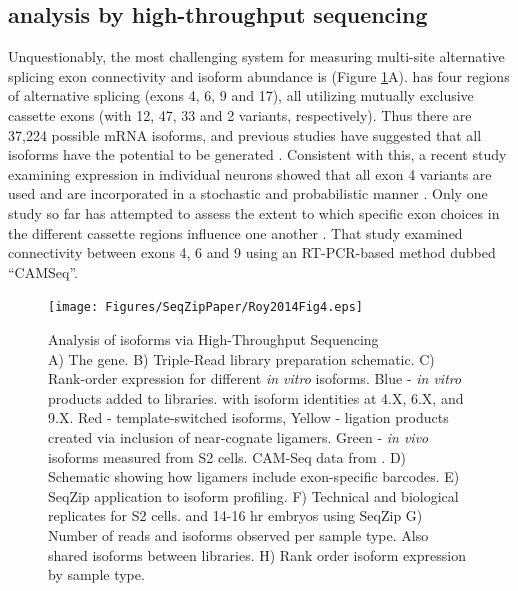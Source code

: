 	\subsection{\dscam{} analysis by high-throughput sequencing}
		\label{SeqZipPaper:subsec:Dscam SeqZip Controls}

		Unquestionably, the most challenging system for measuring multi-site alternative splicing exon connectivity and isoform abundance is \dscam{} (Figure \ref{SeqZipPaper:fig:Roy2014 F4}A). \dscam{} has four regions of alternative splicing (exons 4, 6, 9 and 17), all utilizing mutually exclusive cassette exons (with 12, 47, 33 and 2 variants, respectively). Thus there are 37,224 possible \dscam{} mRNA isoforms, and previous studies have suggested that all isoforms have the potential to be generated \citep{Neves2004,Zhan2004,Sun2013}. Consistent with this, a recent study examining \dscam{} expression in individual neurons showed that all exon 4 variants are used and are incorporated in a stochastic and probabilistic manner \citep{Miura2013b}. Only one study so far has attempted to assess the extent to which specific exon choices in the different cassette regions influence one another \citep{Sun2013}. That study examined connectivity between exons 4, 6 and 9 using an RT-PCR-based method dubbed ``CAMSeq''.

		\begin{figure} %
			\centering 
			\texttt{[image: Figures/SeqZipPaper/Roy2014Fig4.eps]}
			\caption[Analysis of \dscam{} isoforms via High-Throughput Sequencing]
			{ 
				Analysis of \dscam{} isoforms via High-Throughput Sequencing\\[0.25cm]
				A) The \dscam{} gene. B) Triple-Read library preparation schematic. C) Rank-order expression for different \textit{in vitro} \dscam{} isoforms. Blue - \textit{in vitro} products added to libraries. with isoform identities at 4.X, 6.X, and 9.X. Red - template-switched isoforms, Yellow - ligation products created via inclusion of near-cognate ligamers. Green - \textit{in vivo} isoforms measured from S2 cells. CAM-Seq data from \citep{Sun2013}. D) Schematic showing how ligamers include exon-specific barcodes. E) SeqZip application to \dscam{} isoform profiling. F) Technical and biological replicates for S2 cells. and 14-16 hr embryos using SeqZip G) Number of reads and isoforms observed per sample type. Also shared isoforms between libraries. H) Rank order isoform expression by sample type.
				}
			\label{SeqZipPaper:fig:Roy2014 F4}
			\end{figure}

